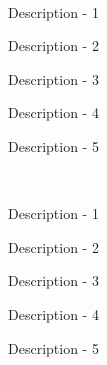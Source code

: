 \documentclass[11pt, a4paper]{resume-lab}
\begin{document}
\begin{Parallel}[v]{0.265\textwidth}{0.66\textwidth}
{\begin{textblock}{2}
	\vspace{5mm}\\
	\interestsection
	{
		\begin{skillitems} %
			\item {Description - 1}
			\item {Description - 2}
			\item {Description - 3}
			\item {Description - 4}
			\item {Description - 5}
		\end{skillitems}
	}

	\vspace{5mm}\\
	\interestsection
	{
		\begin{skillitems} %
			\item {Description - 1}
			\item {Description - 2}
			\item {Description - 3}
			\item {Description - 4}
			\item {Description - 5}
		\end{skillitems}
	}
\end{textblock}
}
\ParallelPar

\end{Parallel}





\end{document}

